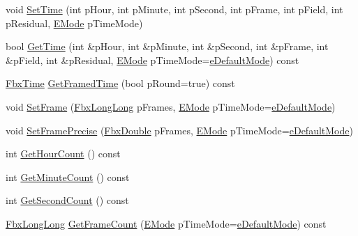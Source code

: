 \begin{DoxyCompactItemize}
\item 
void \hyperlink{class_fbx_time_a3922d4acd406c43e2d27e16feb1593d0}{Set\+Time} (int p\+Hour, int p\+Minute, int p\+Second, int p\+Frame, int p\+Field, int p\+Residual, \hyperlink{class_fbx_time_acc529b00a0e8d4c3da3702449ca93031}{E\+Mode} p\+Time\+Mode)
\item 
bool \hyperlink{class_fbx_time_a3d36e985f2da20e855fa23906c97ed35}{Get\+Time} (int \&p\+Hour, int \&p\+Minute, int \&p\+Second, int \&p\+Frame, int \&p\+Field, int \&p\+Residual, \hyperlink{class_fbx_time_acc529b00a0e8d4c3da3702449ca93031}{E\+Mode} p\+Time\+Mode=\hyperlink{class_fbx_time_acc529b00a0e8d4c3da3702449ca93031a1490a2efc4429bf125761d75f2aa06a6}{e\+Default\+Mode}) const
\item 
\hyperlink{class_fbx_time}{Fbx\+Time} \hyperlink{class_fbx_time_a5bd6ad8a4d3b18167e5350db42680f96}{Get\+Framed\+Time} (bool p\+Round=true) const
\item 
void \hyperlink{class_fbx_time_ac695b38f72d522f8d592404b6f301fe4}{Set\+Frame} (\hyperlink{fbxtypes_8h_ac34da60c22b0a7e1156e5480da7d71f1}{Fbx\+Long\+Long} p\+Frames, \hyperlink{class_fbx_time_acc529b00a0e8d4c3da3702449ca93031}{E\+Mode} p\+Time\+Mode=\hyperlink{class_fbx_time_acc529b00a0e8d4c3da3702449ca93031a1490a2efc4429bf125761d75f2aa06a6}{e\+Default\+Mode})
\item 
void \hyperlink{class_fbx_time_aab76f3007f42dbeb80fc552c9e4175be}{Set\+Frame\+Precise} (\hyperlink{fbxtypes_8h_a171e72a1c46fc15c1a6c9c31948c1c5b}{Fbx\+Double} p\+Frames, \hyperlink{class_fbx_time_acc529b00a0e8d4c3da3702449ca93031}{E\+Mode} p\+Time\+Mode=\hyperlink{class_fbx_time_acc529b00a0e8d4c3da3702449ca93031a1490a2efc4429bf125761d75f2aa06a6}{e\+Default\+Mode})
\item 
int \hyperlink{class_fbx_time_acd535f01e345e54e3f3bb0c12c482d37}{Get\+Hour\+Count} () const
\item 
int \hyperlink{class_fbx_time_aa8c9ef48cd8d43e83e1c3bb42d62ca95}{Get\+Minute\+Count} () const
\item 
int \hyperlink{class_fbx_time_abccce651a65f2c4232cc238f35c3a5d4}{Get\+Second\+Count} () const
\item 
\hyperlink{fbxtypes_8h_ac34da60c22b0a7e1156e5480da7d71f1}{Fbx\+Long\+Long} \hyperlink{class_fbx_time_a56cfe7c115f3191ba4a1b908806baf1b}{Get\+Frame\+Count} (\hyperlink{class_fbx_time_acc529b00a0e8d4c3da3702449ca93031}{E\+Mode} p\+Time\+Mode=\hyperlink{class_fbx_time_acc529b00a0e8d4c3da3702449ca93031a1490a2efc4429bf125761d75f2aa06a6}{e\+Default\+Mode}) const
\item 

\end{DoxyCompactItemize}
